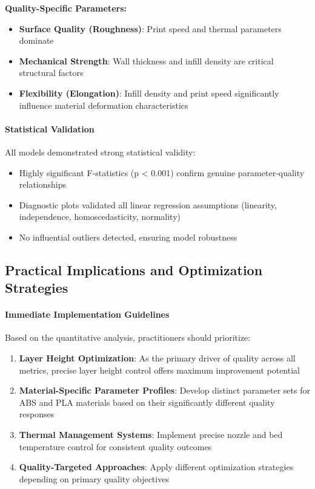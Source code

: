 \textbf{Quality-Specific Parameters:}
\begin{itemize}
    \item \textbf{Surface Quality (Roughness)}: Print speed and thermal parameters dominate
    \item \textbf{Mechanical Strength}: Wall thickness and infill density are critical structural factors
    \item \textbf{Flexibility (Elongation)}: Infill density and print speed significantly influence material deformation characteristics
\end{itemize}

\paragraph{Statistical Validation}
All models demonstrated strong statistical validity:
\begin{itemize}
    \item Highly significant F-statistics (p < 0.001) confirm genuine parameter-quality relationships
    \item Diagnostic plots validated all linear regression assumptions (linearity, independence, homoscedasticity, normality)
    \item No influential outliers detected, ensuring model robustness
\end{itemize}

\subsection{Practical Implications and Optimization Strategies}

\paragraph{Immediate Implementation Guidelines}
Based on the quantitative analysis, practitioners should prioritize:

\begin{enumerate}
    \item \textbf{Layer Height Optimization}: As the primary driver of quality across all metrics, precise layer height control offers maximum improvement potential
    \item \textbf{Material-Specific Parameter Profiles}: Develop distinct parameter sets for ABS and PLA materials based on their significantly different quality responses
    \item \textbf{Thermal Management Systems}: Implement precise nozzle and bed temperature control for consistent quality outcomes
    \item \textbf{Quality-Targeted Approaches}: Apply different optimization strategies depending on primary quality objectives
\end{enumerate}

